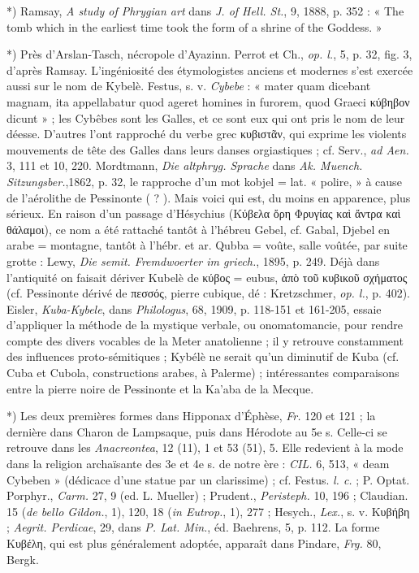 \documentclass[a4paper, 11pt, oneside, polutonikogreek, french]{article}
\begin{document}
*) Ramsay, \emph{A study of Phrygian art} dans \emph{J. of Hell. St.}, 9, 1888, p. 352 : « The tomb which in the earliest time took the form of a shrine of the Goddess. »

*) Près d'Arslan-Tasch, nécropole d'Ayazinn. Perrot et Ch., \emph{op. l.}, 5, p. 32, fig. 3, d'après Ramsay. L'ingéniosité des étymologistes anciens et modernes s'est exercée aussi sur le nom de Kybelè. Festus, s. v. \emph{Cybebe} : « mater quam dicebant magnam, ita appellabatur quod ageret homines in furorem, quod Graeci κύβηβον dicunt » ; les Cybêbes sont les Galles, et ce sont eux qui ont pris le nom de leur déesse. D'autres l'ont rapproché du verbe grec κυβιστᾶν, qui exprime les violents mouvements de tête des Galles dans leurs danses orgiastiques ; cf. Serv., \emph{ad Aen.} 3, 111 et 10, 220. Mordtmann, \emph{Die altphryg. Sprache} dans \emph{Ak. Muench. Sitzungsber.},1862, p. 32, le rapproche d'un mot kobjel = lat. « polire, » à cause de l'aérolithe de Pessinonte ( ? ). Mais voici qui est, du moins en apparence, plus sérieux. En raison d'un passage d'Hésychius (Κύβελα ὄρη Φρυγίας καὶ ἄντρα καὶ θάλαμοι), ce nom a été rattaché tantôt à l'hébreu Gebel, cf. Gabal, Djebel en arabe = montagne, tantôt à l'hébr. et ar. Qubba = voûte, salle voûtée, par suite grotte : Lewy, \emph{Die semit. Fremdwoerter im griech.}, 1895, p. 249. Déjà dans l'antiquité on faisait dériver Kubelè de κύβος = eubus, ἀπὸ τοῦ κυβικοῦ σχήματος (cf. Pessinonte dérivé de πεσσός, pierre cubique, dé : Kretzschmer, \emph{op. l.}, p. 402). Eisler, \emph{Kuba-Kybele}, dans \emph{Philologus}, 68, 1909, p. 118-151 et 161-205, essaie d'appliquer la méthode de la mystique verbale, ou onomatomancie, pour rendre compte des divers vocables de la Meter anatolienne ; il y retrouve constamment des influences proto-sémitiques ; Kybélè ne serait qu'un diminutif de Kuba (cf. Cuba et Cubola, constructions arabes, à Palerme) ; intéressantes comparaisons entre la pierre noire de Pessinonte et la Ka'aba de la Mecque.

*) Les deux premières formes dans Hipponax d'Éphèse, \emph{Fr.} 120 et 121 ; la dernière dans Charon de Lampsaque, puis dans Hérodote au 5e s. Celle-ci se retrouve dans les \emph{Anacreontea}, 12 (11), 1 et 53 (51), 5. Elle redevient à la mode dans la religion archaïsante des 3e et 4e s. de notre ère : \emph{CIL.} 6, 513, « deam Cybeben » (dédicace d'une statue par un clarissime) ; cf. Festus. \emph{l. c.} ; P. Optat. Porphyr., \emph{Carm.} 27, 9 (ed. L. Mueller) ; Prudent., \emph{Peristeph.} 10, 196 ; Claudian. 15 (\emph{de bello Gildon.}, 1), 120, 18 (\emph{in Eutrop.}, 1), 277 ; Hesych., \emph{Lex.}, s. v. Κυβήβη ; \emph{Aegrit. Perdicae}, 29, dans \emph{P. Lat. Min.}, éd. Baehrens, 5, p. 112. La forme Κυβέλη, qui est plus généralement adoptée, apparaît dans Pindare, \emph{Frg.} 80, Bergk.
\end{document}
